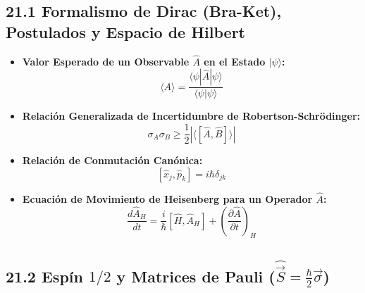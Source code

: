 \documentclass[11pt,a4paper]{article}
\begin{document}
\subsection*{21.1 Formalismo de Dirac (Bra-Ket), Postulados y Espacio de Hilbert}

\begin{itemize}
  \item \textbf{Valor Esperado de un Observable $\hat{A}$ en el Estado $|\psi\rangle$:}
  \[
    \langle A \rangle = \frac{\langle\psi|\hat{A}|\psi\rangle}{\langle\psi|\psi\rangle}
  \]
  \item \textbf{Relación Generalizada de Incertidumbre de Robertson-Schrödinger:}
  \[
    \sigma_A \sigma_B \ge \frac{1}{2} |\langle [\hat{A}, \hat{B}] \rangle|
  \]
  \item \textbf{Relación de Conmutación Canónica:}
  \[
    [\hat{x}_j, \hat{p}_k] = i\hbar \delta_{jk}
  \]
  \item \textbf{Ecuación de Movimiento de Heisenberg para un Operador $\hat{A}$:}
  \[
    \frac{d\hat{A}_H}{dt} = \frac{i}{\hbar}[\hat{H}, \hat{A}_H] + \left( \frac{\partial\hat{A}}{\partial t} \right)_H
  \]
\end{itemize}

\subsection*{21.2 Espín $1/2$ y Matrices de Pauli ($\hat{\vec{S}} = \frac{\hbar}{2}\vec{\sigma}$)}
\end{document}
